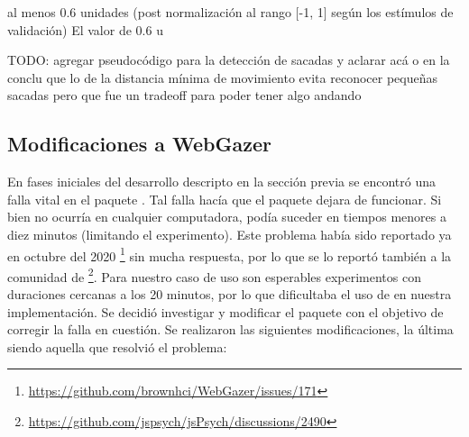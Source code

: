 al menos 0.6 unidades (post normalización al
rango [-1, 1] según los estímulos de validación)
El valor de 0.6 u

TODO: agregar pseudocódigo para la detección de sacadas y aclarar acá o en la
      conclu que lo de la distancia mínima de movimiento evita reconocer
      pequeñas sacadas pero que fue un tradeoff para poder tener algo andando

\subsection{Modificaciones a WebGazer}

En fases iniciales del desarrollo descripto en la sección previa se encontró
una falla vital en el paquete \webgazer.
Tal falla hacía que el paquete dejara de funcionar.
Si bien no ocurría en cualquier computadora, podía suceder en tiempos menores a
diez minutos (limitando el experimento).
Este problema había sido reportado ya en octubre del 2020
\footnote{\url{https://github.com/brownhci/WebGazer/issues/171}} sin mucha
respuesta, por lo que se lo reportó también a la comunidad de \jspsych
\footnote{\url{https://github.com/jspsych/jsPsych/discussions/2490}}.
Para nuestro caso de uso son esperables experimentos con duraciones cercanas a
los 20 minutos, por lo que dificultaba el uso de \webgazer en nuestra
implementación.
Se decidió investigar y modificar el paquete con el objetivo de corregir la
falla en cuestión.
Se realizaron las siguientes modificaciones, la última siendo aquella que
resolvió el problema:

